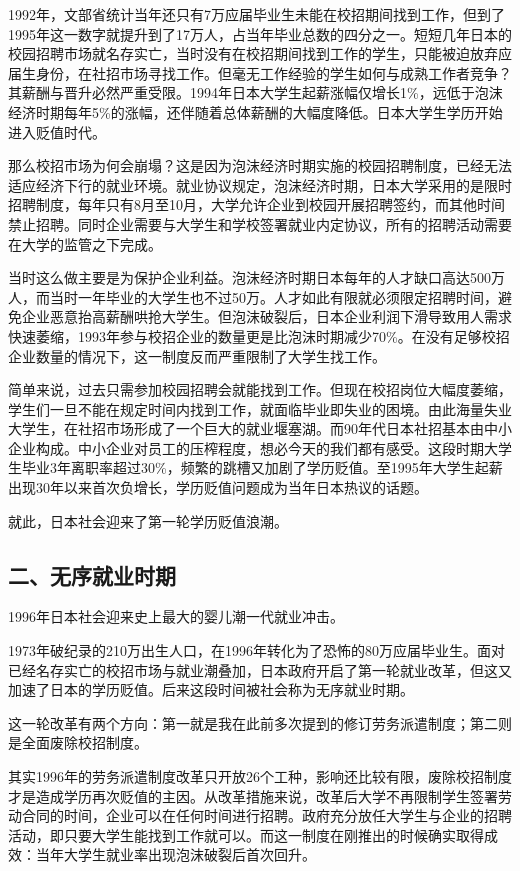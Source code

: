 1992年，文部省统计当年还只有7万应届毕业生未能在校招期间找到工作，但到了1995年这一数字就提升到了17万人，占当年毕业总数的四分之一。短短几年日本的校园招聘市场就名存实亡，当时没有在校招期间找到工作的学生，只能被迫放弃应届生身份，在社招市场寻找工作。但毫无工作经验的学生如何与成熟工作者竞争？其薪酬与晋升必然严重受限。1994年日本大学生起薪涨幅仅增长1\%，远低于泡沫经济时期每年5\%的涨幅，还伴随着总体薪酬的大幅度降低。日本大学生学历开始进入贬值时代。

那么校招市场为何会崩塌？这是因为泡沫经济时期实施的校园招聘制度，已经无法适应经济下行的就业环境。就业协议规定，泡沫经济时期，日本大学采用的是限时招聘制度，每年只有8月至10月，大学允许企业到校园开展招聘签约，而其他时间禁止招聘。同时企业需要与大学生和学校签署就业内定协议，所有的招聘活动需要在大学的监管之下完成。

当时这么做主要是为保护企业利益。泡沫经济时期日本每年的人才缺口高达500万人，而当时一年毕业的大学生也不过50万。人才如此有限就必须限定招聘时间，避免企业恶意抬高薪酬哄抢大学生。但泡沫破裂后，日本企业利润下滑导致用人需求快速萎缩，1993年参与校招企业的数量更是比泡沫时期减少70\%。在没有足够校招企业数量的情况下，这一制度反而严重限制了大学生找工作。

简单来说，过去只需参加校园招聘会就能找到工作。但现在校招岗位大幅度萎缩，学生们一旦不能在规定时间内找到工作，就面临毕业即失业的困境。由此海量失业大学生，在社招市场形成了一个巨大的就业堰塞湖。而90年代日本社招基本由中小企业构成。中小企业对员工的压榨程度，想必今天的我们都有感受。这段时期大学生毕业3年离职率超过30\%，频繁的跳槽又加剧了学历贬值。至1995年大学生起薪出现30年以来首次负增长，学历贬值问题成为当年日本热议的话题。

就此，日本社会迎来了第一轮学历贬值浪潮。

\subsection{二、无序就业时期}

1996年日本社会迎来史上最大的婴儿潮一代就业冲击。

1973年破纪录的210万出生人口，在1996年转化为了恐怖的80万应届毕业生。面对已经名存实亡的校招市场与就业潮叠加，日本政府开启了第一轮就业改革，但这又加速了日本的学历贬值。后来这段时间被社会称为无序就业时期。

这一轮改革有两个方向：第一就是我在此前多次提到的修订劳务派遣制度；第二则是全面废除校招制度。

其实1996年的劳务派遣制度改革只开放26个工种，影响还比较有限，废除校招制度才是造成学历再次贬值的主因。从改革措施来说，改革后大学不再限制学生签署劳动合同的时间，企业可以在任何时间进行招聘。政府充分放任大学生与企业的招聘活动，即只要大学生能找到工作就可以。而这一制度在刚推出的时候确实取得成效：当年大学生就业率出现泡沫破裂后首次回升。

